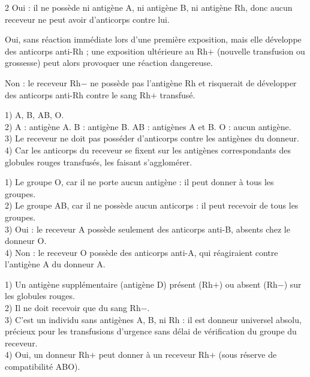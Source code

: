 \begin{multicols}{2}
Oui : il ne possède ni antigène A, ni antigène B, ni antigène Rh, donc aucun receveur ne
peut avoir d'anticorps contre lui.

Oui, sans réaction immédiate lors d'une première exposition, mais elle développe des
anticorps anti-Rh ; une exposition ultérieure au Rh$+$ (nouvelle transfusion ou grossesse)
peut alors provoquer une réaction dangereuse.

Non : le receveur Rh$-$ ne possède pas l'antigène Rh et risquerait de développer des
anticorps anti-Rh contre le sang Rh$+$ transfusé.

1) A, B, AB, O.\\
2) A : antigène A. B : antigène B. AB : antigènes A et B. O : aucun antigène.\\
3) Le receveur ne doit pas posséder d'anticorps contre les antigènes du donneur.\\
4) Car les anticorps du receveur se fixent sur les antigènes correspondants des globules
rouges transfusés, les faisant s'agglomérer.

1) Le groupe O, car il ne porte aucun antigène : il peut donner à tous les groupes.\\
2) Le groupe AB, car il ne possède aucun anticorps : il peut recevoir de tous les
groupes.\\
3) Oui : le receveur A possède seulement des anticorps anti-B, absents chez le donneur
O.\\
4) Non : le receveur O possède des anticorps anti-A, qui réagiraient contre l'antigène A
du donneur A.

1) Un antigène supplémentaire (antigène D) présent (Rh$+$) ou absent (Rh$-$) sur les
globules rouges.\\
2) Il ne doit recevoir que du sang Rh$-$.\\
3) C'est un individu sans antigènes A, B, ni Rh : il est donneur universel absolu,
précieux pour les transfusions d'urgence sans délai de vérification du groupe du
receveur.\\
4) Oui, un donneur Rh$+$ peut donner à un receveur Rh$+$ (sous réserve de compatibilité
ABO).

\end{multicols}
\exercicesBanner
